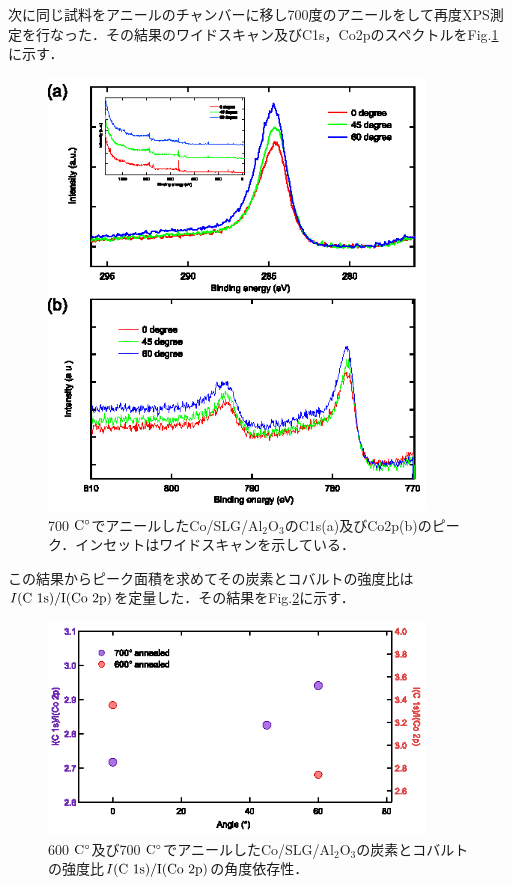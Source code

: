 {次に同じ試料をアニールのチャンバーに移し700度のアニールをして再度XPS測定を行なった．その結果のワイドスキャン及びC1s，Co2pのスペクトルをFig.\ref{fig:700aneal_1st}に示す．

\begin{figure}[htbp]
\centerline{
\includegraphics[width=10cm]{images/700aneal_1st.eps}
}
\caption{700$\rm\ C^{\circ}$でアニールしたCo/SLG/Al$_{2}$O$_{3}$のC1s(a)及びCo2p(b)のピーク．インセットはワイドスキャンを示している．
}
\label{fig:700aneal_1st} 
\end{figure}

この結果からピーク面積を求めてその炭素とコバルトの強度比は$I(\rm C\ 1s)/I(\rm Co\ 2p)$を定量した．その結果をFig.\ref{fig:rate_comparison}に示す．

\begin{figure}[htbp]
\centerline{
\includegraphics[width=10cm]{images/rate_comarison.eps}
}
\caption{600$\rm\ C^{\circ}$及び700$\rm\ C^{\circ}$でアニールしたCo/SLG/Al$_{2}$O$_{3}$の炭素とコバルトの強度比$I(\rm C\ 1s)/I(\rm Co\ 2p)$の角度依存性．
}
\label{fig:rate_comparison} 
\end{figure}

}
